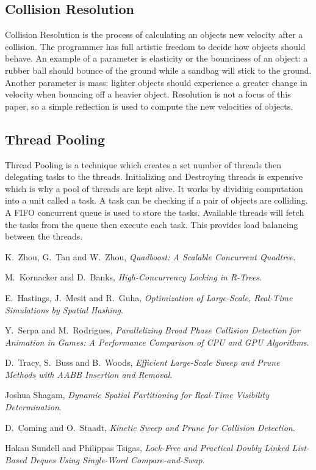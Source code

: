 \documentclass[conference]{IEEEtran}
\begin{document}
	\subsection{Collision Resolution}
	Collision Resolution is the process of calculating an object\textquotesingle s new velocity after a collision. The programmer has full artistic freedom to decide how objects should behave. An example of a parameter is elasticity or the bounciness of an object: a rubber ball should bounce of the ground while a sandbag will stick to the ground. Another parameter is mass: lighter objects should experience a greater change in velocity when bouncing off a heavier object. Resolution is not a focus of this paper, so a simple reflection is used to compute the new velocities of objects.\\
	
	\subsection{Thread Pooling}
	Thread Pooling is a technique which creates a set number of threads then delegating tasks to the threads. Initializing and Destroying threads is expensive which is why a pool of threads are kept alive. It works by dividing computation into a unit called a task. A task can be checking if a pair of objects are colliding. A FIFO concurrent queue is used to store the tasks. Available threads will fetch the tasks from the queue then execute each task. This provides load balancing between the threads.
	

\begin{thebibliography}{}

K.~Zhou, G.~Tan and W.~Zhou, \emph{Quadboost: A Scalable Concurrent Quadtree}.

M.~Kornacker and D.~Banks, \emph{High-Concurrency Locking in R-Trees}.

E.~Hastings, J.~Mesit and R.~Guha, \emph{Optimization of Large-Scale, Real-Time Simulations by Spatial Hashing}.

Y.~Serpa and M.~Rodrigues, \emph{Parallelizing Broad Phase Collision Detection for Animation in
Games: A Performance Comparison of CPU and GPU Algorithms}.

D.~Tracy, S.~Buss and B.~Woods, \emph{Efficient Large-Scale Sweep and Prune Methods with AABB Insertion and
Removal}.

Joshua Shagam, \emph{Dynamic Spatial Partitioning for Real-Time Visibility Determination}.

D.~Coming and O.~Staadt, \emph{Kinetic Sweep and Prune for Collision Detection}.

Hakan Sundell and Philippas Tsigas, \emph{Lock-Free and Practical Doubly Linked List-Based Deques Using Single-Word Compare-and-Swap}.
\end{thebibliography}
\end{document}
